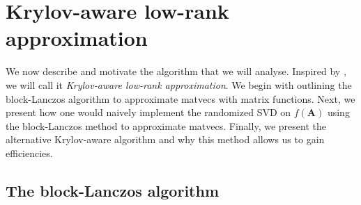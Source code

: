 \section{Krylov-aware low-rank approximation}

We now describe and motivate the algorithm that we will analyse. Inspired by \cite{chen_hallman_23}, we will call it \textit{Krylov-aware low-rank approximation}. 
We begin with outlining the block-Lanczos algorithm to approximate matvecs with matrix functions. Next, we present how one would naively implement the randomized SVD on $f(\bm{A})$ using the block-Lanczos method to approximate matvecs. Finally, we present the alternative Krylov-aware algorithm and why this method allows us to gain efficiencies. 

\subsection{The block-Lanczos algorithm}\label{section:block_lanczos}

